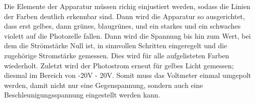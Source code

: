 Die Elemente der Apparatur müssen richig einjustiert werden, sodass die Linien der Farben deutlich erkennbar sind. Dann wird die Apparatur so ausgerichtet, dass erst gelbes, dann grünes, blaugrünes, und ein starkes und ein schwaches violett auf die Photozelle fallen.
Dann wird die Spannung bis hin zum Wert, bei dem die Strömstärke Null ist, in sinnvollen Schritten eingeregelt und die zugehörige Stromstärke gemessen.
Dies wird für alle aufgelisteten Farben wiederholt.
Zuletzt wird der Photostrom erneut für gelbes Licht gemessen; diesmal im Bereich von -20V - 20V. Somit muss das Voltmeter einmal umgepolt werden, damit nicht nur eine Gegenspannung, sondern auch eine Beschleunigungsspannung eingestellt werden kann.